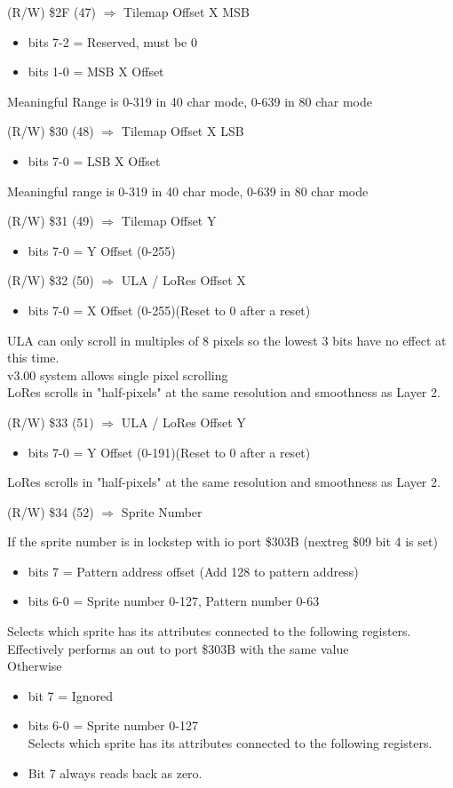 (R/W) \$2F (47) $\Rightarrow$ Tilemap Offset X MSB
\begin{itemize}
\item[] bits 7-2 = Reserved, must be 0
\item[] bits 1-0 = MSB X Offset
\end{itemize}
Meaningful Range is 0-319 in 40 char mode, 0-639 in 80 char mode

(R/W) \$30 (48) $\Rightarrow$ Tilemap Offset X LSB
\begin{itemize}
\item[] bits 7-0 = LSB X Offset
\end{itemize}
Meaningful range is 0-319 in 40 char mode, 0-639 in 80 char mode

(R/W) \$31 (49) $\Rightarrow$ Tilemap Offset Y
\begin{itemize}
\item[] bits 7-0 = Y Offset (0-255)
\end{itemize}

(R/W) \$32 (50) $\Rightarrow$ ULA / LoRes Offset X
\begin{itemize}
\item[] bits 7-0 = X Offset (0-255)(Reset to 0 after a reset)
\end{itemize}
ULA can only scroll in multiples of 8 pixels so the lowest 3 bits have
no effect at this time.\\
v3.00 system allows single pixel scrolling\\
LoRes scrolls in "half-pixels" at the same resolution and smoothness
as Layer 2.

(R/W) \$33 (51) $\Rightarrow$ ULA / LoRes Offset Y
\begin{itemize}
\item[] bits 7-0 = Y Offset (0-191)(Reset to 0 after a reset)
\end{itemize}
LoRes scrolls in "half-pixels" at the same resolution and smoothness
as Layer 2.

(R/W) \$34 (52) $\Rightarrow$ Sprite Number

If the sprite number is in lockstep with io port \$303B (nextreg \$09
bit 4 is set)
\begin{itemize}
\item[] bits 7 = Pattern address offset (Add 128 to pattern address)
\item[] bits 6-0 = Sprite number 0-127, Pattern number 0-63
\end{itemize}
Selects which sprite has its attributes connected to the following
registers.  Effectively performs an out to port \$303B with the same
value\\
Otherwise
\begin{itemize}
\item[] bit 7 = Ignored
\item[] bits 6-0 = Sprite number 0-127\\
  Selects which sprite has its attributes connected to the following registers.
\item[] Bit 7 always reads back as zero.
\end{itemize}

